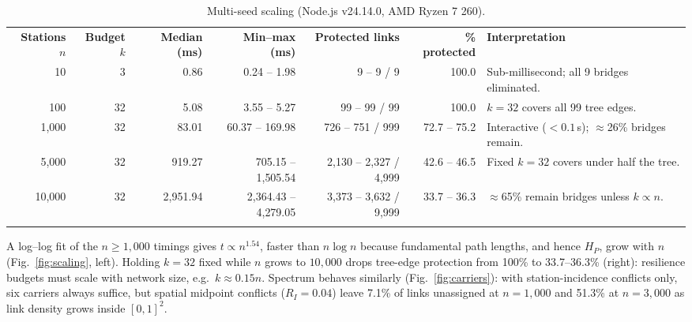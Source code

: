 \documentclass[10pt,a4paper]{article}
\newcommand\toprule{\noalign{\hrule height 0.8pt\vskip 2pt}}
\newcommand\midrule{\noalign{\vskip 1pt\hrule height 0.4pt\vskip 2pt}}
\newcommand\bottomrule{\noalign{\vskip 1pt\hrule height 0.8pt}}
\newcommand\thd[1]{\textbf{#1}}
\begin{document}
\begin{table}[h]
\caption{Multi-seed scaling (Node.js v24.14.0, AMD Ryzen 7 260).}\label{tab:scaling}
\footnotesize
\begin{tabularx}{\textwidth}{@{}rrrrrrL@{}}
\toprule
\thd{Stations $n$} & \thd{Budget $k$} & \thd{Median (ms)} & \thd{Min--max (ms)} & \thd{Protected links} & \thd{\% protected} & \thd{Interpretation}\\
\midrule
10 & 3 & 0.86 & 0.24 -- 1.98 & 9 -- 9 / 9 & 100.0 & Sub-millisecond; all 9 bridges eliminated.\\
100 & 32 & 5.08 & 3.55 -- 5.27 & 99 -- 99 / 99 & 100.0 & $k=32$ covers all 99 tree edges.\\
1{,}000 & 32 & 83.01 & 60.37 -- 169.98 & 726 -- 751 / 999 & 72.7 -- 75.2 & Interactive ($<0.1$\,s); $\approx$26\% bridges remain.\\
5{,}000 & 32 & 919.27 & 705.15 -- 1{,}505.54 & 2{,}130 -- 2{,}327 / 4{,}999 & 42.6 -- 46.5 & Fixed $k=32$ covers under half the tree.\\
10{,}000 & 32 & 2{,}951.94 & 2{,}364.43 -- 4{,}279.05 & 3{,}373 -- 3{,}632 / 9{,}999 & 33.7 -- 36.3 & $\approx$65\% remain bridges unless $k\propto n$.\\
\bottomrule
\end{tabularx}
\end{table}

A log--log fit of the $n\ge1{,}000$ timings gives $t\propto n^{1.54}$, faster than $n\log n$ because fundamental path lengths, and
hence $H_P$, grow with $n$ (Fig.~\ref{fig:scaling}, left). Holding $k=32$ fixed while $n$ grows to $10{,}000$ drops tree-edge
protection from 100\% to 33.7--36.3\% (right): resilience budgets must scale with network size, e.g.\ $k\approx0.15n$.
Spectrum behaves similarly (Fig.~\ref{fig:carriers}): with station-incidence conflicts only, six carriers always suffice, but
spatial midpoint conflicts ($R_I=0.04$) leave 7.1\% of links unassigned at $n=1{,}000$ and 51.3\% at $n=3{,}000$ as link density
grows inside $[0,1]^2$.
\end{document}
